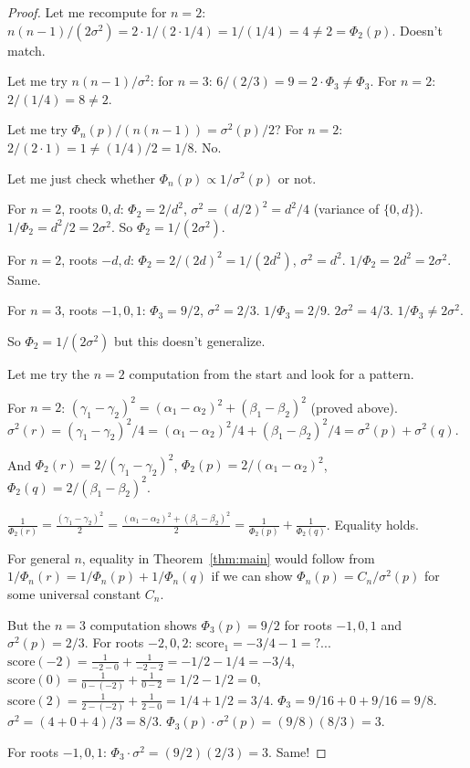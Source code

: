 \documentclass[12pt]{article}
\theoremstyle{definition}
\newcommand{\score}{\mathrm{score}}
\begin{document}
\begin{proof}
Let me recompute for $n=2$: $n(n-1)/(2\sigma^2)=2\cdot1/(2\cdot 1/4)=1/(1/4)=4\neq 2=\Phi_2(p)$.  Doesn't match.

Let me try $n(n-1)/\sigma^2$: for $n=3$: $6/(2/3)=9=2\cdot\Phi_3\neq\Phi_3$.  For $n=2$: $2/(1/4)=8\neq 2$.

Let me try $\Phi_n(p)/(n(n-1))=\sigma^2(p)/2$?  For $n=2$: $2/(2\cdot 1)=1\neq (1/4)/2=1/8$.  No.

Let me just check whether $\Phi_n(p)\propto 1/\sigma^2(p)$ or not.

For $n=2$, roots $0,d$: $\Phi_2=2/d^2$, $\sigma^2=(d/2)^2=d^2/4$ (variance of $\{0,d\}$).
$1/\Phi_2=d^2/2=2\sigma^2$. So $\Phi_2=1/(2\sigma^2)$.

For $n=2$, roots $-d, d$: $\Phi_2=2/(2d)^2=1/(2d^2)$, $\sigma^2=d^2$.
$1/\Phi_2=2d^2=2\sigma^2$.  Same.

For $n=3$, roots $-1,0,1$: $\Phi_3=9/2$, $\sigma^2=2/3$.  $1/\Phi_3=2/9$.  $2\sigma^2=4/3$.  $1/\Phi_3\neq 2\sigma^2$.

So $\Phi_2=1/(2\sigma^2)$ but this doesn't generalize.

Let me try the $n=2$ computation from the start and look for a pattern.

For $n=2$: $(\gamma_1-\gamma_2)^2=(\alpha_1-\alpha_2)^2+(\beta_1-\beta_2)^2$ (proved above).
$\sigma^2(r)=(\gamma_1-\gamma_2)^2/4=(\alpha_1-\alpha_2)^2/4+(\beta_1-\beta_2)^2/4=\sigma^2(p)+\sigma^2(q)$.

And $\Phi_2(r)=2/(\gamma_1-\gamma_2)^2$, $\Phi_2(p)=2/(\alpha_1-\alpha_2)^2$, $\Phi_2(q)=2/(\beta_1-\beta_2)^2$.

$\frac{1}{\Phi_2(r)}=\frac{(\gamma_1-\gamma_2)^2}{2}=\frac{(\alpha_1-\alpha_2)^2+(\beta_1-\beta_2)^2}{2}=\frac{1}{\Phi_2(p)}+\frac{1}{\Phi_2(q)}$. Equality holds.

For general $n$, equality in Theorem~\ref{thm:main} would follow from $1/\Phi_n(r)=1/\Phi_n(p)+1/\Phi_n(q)$ if we can show $\Phi_n(p)=C_n/\sigma^2(p)$ for some universal constant $C_n$.

But the $n=3$ computation shows $\Phi_3(p)=9/2$ for roots $-1,0,1$ and $\sigma^2(p)=2/3$.
For roots $-2,0,2$: $\score_1=-3/4-1=?$... $\score(-2)=\frac{1}{-2-0}+\frac{1}{-2-2}=-1/2-1/4=-3/4$, $\score(0)=\frac{1}{0-(-2)}+\frac{1}{0-2}=1/2-1/2=0$, $\score(2)=\frac{1}{2-(-2)}+\frac{1}{2-0}=1/4+1/2=3/4$.
$\Phi_3=9/16+0+9/16=9/8$.  $\sigma^2=(4+0+4)/3=8/3$.
$\Phi_3(p)\cdot\sigma^2(p)=(9/8)(8/3)=3$.

For roots $-1,0,1$: $\Phi_3\cdot\sigma^2=(9/2)(2/3)=3$.  Same!


\end{proof}
\end{document}
